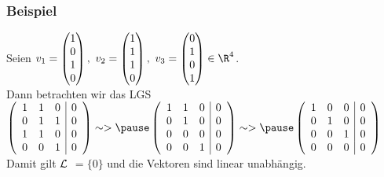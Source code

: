 %
\begin{frame}\frametitle{Beispiel}
Seien $v_1=\begin{pmatrix} 1\\0\\1\\0 \end{pmatrix},\ v_2=\begin{pmatrix} 1\\1\\1\\0 \end{pmatrix}, \ v_3=\begin{pmatrix} 0\\1\\0\\1 \end{pmatrix} \in \R^4$.\\\vfill \pause
Dann betrachten wir das LGS\\\vfill
		$\left(
		\begin{array}{ccc|c}
			1&1&0 	&0\\
			0&1&1	&0\\
			1&1&0	&0\\
			0&0&1   &0
		\end{array}
		\right) \sim>\pause \left(
		\begin{array}{ccc|c}
			1&1&0 	&0\\
			0&1&0	&0\\
			0&0&0	&0\\
			0&0&1   &0
		\end{array}
		\right) \sim>\pause\left(
		\begin{array}{ccc|c}
			1&0&0 	&0\\
			0&1&0	&0\\
			0&0&1	&0\\
			0&0&0   &0
		\end{array}
		\right)$\\\vfill
Damit gilt $\cal L$ $=\{0\}$ und die Vektoren sind linear unabhängig.
\end{frame}
%
